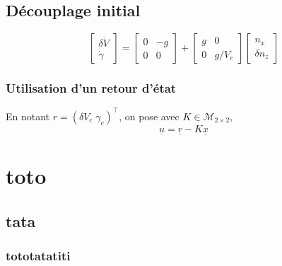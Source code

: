 \documentclass[footheight=2em]{beamer}
\begin{document}
\subsection{D\'ecouplage initial}
\begin{frame}
    \[
        \begin{bmatrix}
            \delta \dot{V} \\ \dot{\gamma}
        \end{bmatrix}
        =
        \begin{bmatrix}
            0 & -g \\
            0 & 0
        \end{bmatrix}
        +
        \begin{bmatrix}
            g & 0 \\
            0 & g/V_e
        \end{bmatrix}
        \begin{bmatrix}
            n_x \\ \delta n_z
        \end{bmatrix}
    \]
\end{frame}
\begin{frame}
    \frametitle{Utilisation d'un retour d'\'etat}
    En notant $r = (\delta V_c \; \gamma_c)^\top$, on pose avec $K \in
    \mathcal{M}_{2\times 2}$,
    \[ \underline{u} = \underline{r} - K\underline{x} \]
\end{frame}

\section{toto}

\subsection{tata}

\begin{frame}
    \frametitle{tototatatiti}
\end{frame}
\end{document}
